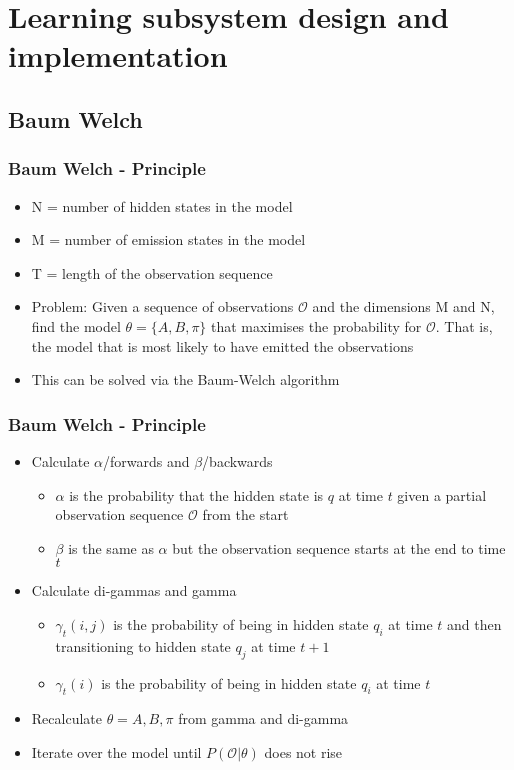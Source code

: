 \section{Learning subsystem design and implementation}
\subsection{Baum Welch}
\begin{frame}
	\frametitle{Baum Welch - Principle}
	\begin{itemize}
		\item N = number of hidden states in the model
		\item M = number of emission states in the model
		\item T = length of the observation sequence
		\item Problem: Given a sequence of observations $\mathcal{O}$ and the dimensions M and N, find the model $\theta = \{A, B, \pi\}$ that maximises the probability for $\mathcal{O}$. That is, the model that is most likely to have emitted the observations
		\item This can be solved via the Baum-Welch algorithm
	\end{itemize}
\end{frame}

\begin{frame}
	\frametitle{Baum Welch - Principle}
	\begin{itemize}
		\item Calculate $\alpha$/forwards and $\beta$/backwards
		\begin{itemize}
			\item $\alpha$ is the probability that the hidden state is $q$ at time $t$ given a partial observation sequence $\mathcal{O}$ from the start
			\item $\beta$ is the same as $\alpha$ but the observation sequence starts at the end to time $t$
		\end{itemize}
		\item Calculate di-gammas and gamma
		\begin{itemize}
			\item $\gamma_t(i,j)$ is the probability of being in hidden state $q_i$ at time $t$ and then transitioning to hidden state $q_j$ at time $t+1$
			\item $\gamma_t(i)$ is the probability of being in hidden state $q_i$ at time $t$
		\end{itemize}
		\item Recalculate $\theta = {A,B,\pi}$ from gamma and di-gamma
        \item Iterate over the model until $P(\mathcal{O}|\theta)$ does not rise
	\end{itemize}
\end{frame}

